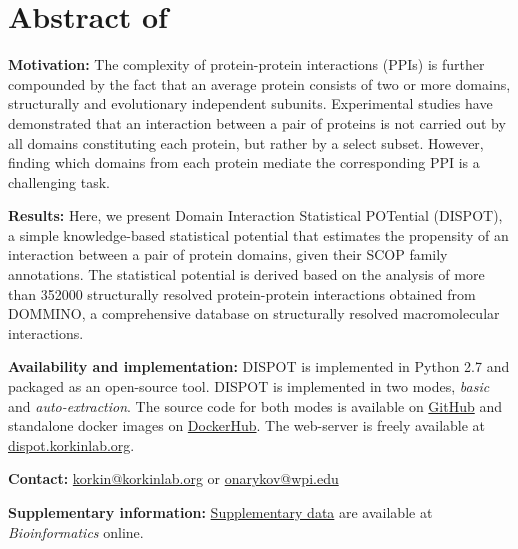 

\chapter{Abstract of \cite{dispot}}\label{section:appendix:dispot-abstract}
\thispagestyle{myheadings}

	\noindent \textbf{Motivation:}
		The complexity of protein-protein interactions (PPIs) is further compounded by the fact that an average protein consists of two or more domains, structurally and evolutionary independent subunits.
		Experimental studies have demonstrated that an interaction between a pair of proteins is not carried out by all domains constituting each protein, but rather by a select subset.
		However, finding which domains from each protein mediate the corresponding PPI is a challenging task.

	\noindent \textbf{Results:}
		Here, we present Domain Interaction Statistical POTential (DISPOT), a simple knowledge-based statistical potential that estimates the propensity of an interaction between a pair of protein domains, given their SCOP family annotations.
		The statistical potential is derived based on the analysis of more than \num{352000} structurally resolved protein-protein interactions obtained from DOMMINO, a comprehensive database on structurally resolved macromolecular interactions.

	\noindent \textbf{Availability and implementation:}
		DISPOT is implemented in Python 2.7 and packaged as an open-source tool.
		DISPOT is implemented in two modes, \emph{basic} and \emph{auto-extraction}.
		The source code for both modes is available on \href{https://github.com/korkinlab/dispot}{GitHub} and standalone docker images on \href{https://hub.docker.com/r/korkinlab/dispot}{DockerHub}.
		The web-server is freely available at \href{http://dispot.korkinlab.org/}{dispot.korkinlab.org}.

	\noindent \textbf{Contact:}
		\href{korkin@korkinlab.org}{korkin@korkinlab.org} or \href{onarykov@wpi.edu}{onarykov@wpi.edu}

	\noindent \textbf{Supplementary information:}
		\href{https://academic.oup.com/bioinformatics/article-lookup/doi/10.1093/bioinformatics/btz587#supplementary-data}{Supplementary data} are available at \textit{Bioinformatics} online.
